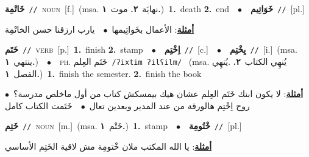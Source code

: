 \documentclass[10pt,a4paper,twoside]{article} %
\begin{document}
\begin{multicols}{2}
{\setlength\topsep{0pt}\textbf{\foreignlanguage{arabic}{خَاتْمِة}}\ {\color{gray}\texttt{//}\color{black}}\ \textsc{noun}\ [f.]\ \color{gray}(msa. \foreignlanguage{arabic}{نهايَة}~\foreignlanguage{arabic}{\textbf{٢.}}  \foreignlanguage{arabic}{موت}~\foreignlanguage{arabic}{\textbf{١.}})\color{black}\ \textbf{1.}~death  \textbf{2.}~end\ \ $\bullet$\ \ \setlength\topsep{0pt}\textbf{\foreignlanguage{arabic}{خَوَاتِيم}}\ {\color{gray}\texttt{//}\color{black}}\ [pl.]\  \begin{flushright}\color{gray}\foreignlanguage{arabic}{\textbf{\underline{\foreignlanguage{arabic}{أمثلة}}}: الأعمال بخَواتِيمها\ $\bullet$\ \  يارب ارزقنا حسن الخاتْمِة}\end{flushright}\color{black}} \vspace{2mm}

{\setlength\topsep{0pt}\textbf{\foreignlanguage{arabic}{خَتَم}}\ {\color{gray}\texttt{//}\color{black}}\ \textsc{verb}\ [p.]\ \textbf{1.}~finish  \textbf{2.}~stamp\ \ $\bullet$\ \ \setlength\topsep{0pt}\textbf{\foreignlanguage{arabic}{اِخْتِم}}\ {\color{gray}\texttt{//}\color{black}}\ [c.]\ \ $\bullet$\ \ \setlength\topsep{0pt}\textbf{\foreignlanguage{arabic}{يِخْتِم}}\ {\color{gray}\texttt{//}\color{black}}\ [i.]\ \color{gray}(msa. \foreignlanguage{arabic}{ينتهي}~\foreignlanguage{arabic}{\textbf{١.}})\color{black}\ \ $\bullet$\ \ \textsc{ph.} \color{gray} \foreignlanguage{arabic}{خَتَم العِلم}\color{black}\ {\color{gray}\texttt{/{\sffamily ʔixtim ʔilʕilm}/}\color{black}}\ \color{gray} (msa. \foreignlanguage{arabic}{يُنهِي الكتاب}~\foreignlanguage{arabic}{\textbf{٢.}}  .\foreignlanguage{arabic}{يُنهِي الفصل}~\foreignlanguage{arabic}{\textbf{١.}})\color{black}\ \textbf{1.}~finish the semester.  \textbf{2.}~finish the book\  \begin{flushright}\color{gray}\foreignlanguage{arabic}{\textbf{\underline{\foreignlanguage{arabic}{أمثلة}}}: لا يكون ابنك خَتَم العِلم عشان هيك بيمسكش كتاب من أول ماخلص مدرسة؟\ $\bullet$\ \  روح اِخْتِم هالورقة من عند المدير وبعدين تعال\ $\bullet$\ \  خَتَمت الكتاب كامل}\end{flushright}\color{black}} \vspace{2mm}

{\setlength\topsep{0pt}\textbf{\foreignlanguage{arabic}{خَتِم}}\ {\color{gray}\texttt{//}\color{black}}\ \textsc{noun}\ [m.]\ \color{gray}(msa. \foreignlanguage{arabic}{خَتْم}~\foreignlanguage{arabic}{\textbf{١.}})\color{black}\ \textbf{1.}~stamp\ \ $\bullet$\ \ \setlength\topsep{0pt}\textbf{\foreignlanguage{arabic}{خْتُومِة}}\ {\color{gray}\texttt{//}\color{black}}\ [pl.]\  \begin{flushright}\color{gray}\foreignlanguage{arabic}{\textbf{\underline{\foreignlanguage{arabic}{أمثلة}}}: يا الله المكتب ملان خْتومِة مش لاقية الخَتِم الأساسي}\end{flushright}\color{black}} \vspace{2mm}


\end{multicols}
\end{document}
